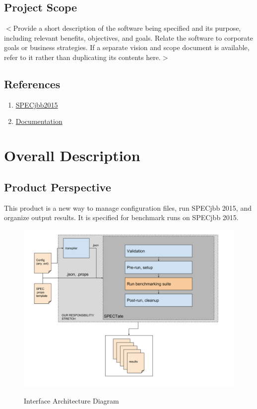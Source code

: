 \documentclass{scrreprt}
\begin{document}
\section{Project Scope}
$<$Provide a short description of the software being specified and its purpose, 
including relevant benefits, objectives, and goals. Relate the software to 
corporate goals or business strategies. If a separate vision and scope document 
is available, refer to it rather than duplicating its contents here.$>$

\section{References}
\begin{enumerate}
	\item \hyperlink{https://www.spec.org/jbb2015}{SPECjbb2015}
	\item \hyperlink{https://github.com/PDXCapstoneF/workloads/wiki}{Documentation}
\end{enumerate}


\chapter{Overall Description}

\section{Product Perspective}
This product is a new way to manage configuration files, run SPECjbb 2015, and organize output results. It is specified for benchmark runs on SPECjbb 2015.
\begin{figure}[h!]
	\centering
	\caption[Diagram]{Interface Architecture Diagram}
	\includegraphics[width=0.8\linewidth]{diagram.png}
	\label{fig:diagram}
\end{figure}
\end{document}

